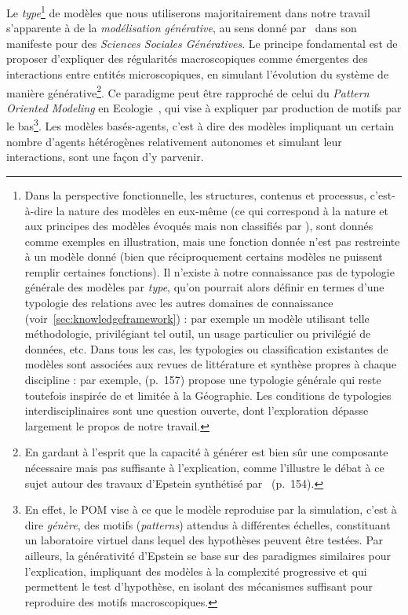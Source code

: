 Le \emph{type}\footnote{Dans la perspective fonctionnelle, les structures, contenus et processus, c'est-à-dire la nature des modèles en eux-même (ce qui correspond à la nature et aux principes des modèles évoqués mais non classifiés par ), sont donnés comme exemples en illustration, mais une fonction donnée n'est pas restreinte à un modèle donné (bien que réciproquement certains modèles ne puissent remplir certaines fonctions). Il n'existe à notre connaissance pas de typologie générale des modèles par \emph{type}, qu'on pourrait alors définir en termes d'une typologie des relations avec les autres domaines de connaissance (voir~\ref{sec:knowledgeframework}) : par exemple un modèle utilisant telle méthodologie, privilégiant tel outil, un usage particulier ou privilégié de données, etc. Dans tous les cas, les typologies ou classification existantes de modèles sont associées aux revues de littérature et synthèse propres à chaque discipline : par exemple, \cite{harvey1969explanation} (p.~157) propose une typologie générale qui reste toutefois inspirée de et limitée à la Géographie. Les conditions de typologies interdisciplinaires sont une question ouverte, dont l'exploration dépasse largement le propos de notre travail.} de modèles que nous utiliserons majoritairement dans notre travail s'apparente à de la \emph{modélisation générative}, au sens donné par~\cite{epstein2006generative} dans son manifeste pour des \emph{Sciences Sociales Génératives}. Le principe fondamental est de proposer d'expliquer des régularités macroscopiques comme émergentes des interactions entre entités microscopiques, en simulant l'évolution du système de manière générative\footnote{En gardant à l'esprit que la capacité à générer est bien sûr une composante nécessaire mais pas suffisante à l'explication, comme l'illustre le débat à ce sujet autour des travaux d'Epstein synthétisé par~\cite{rey2015plateforme} (p.~154).}. Ce paradigme peut être rapproché de celui du \emph{Pattern Oriented Modeling} en Ecologie~\cite{grimm2005pattern}, qui vise à expliquer par production de motifs par le bas\footnote{En effet, le POM vise à ce que le modèle reproduise par la simulation, c'est à dire \emph{génère}, des motifs (\emph{patterns}) attendus à différentes échelles, constituant un laboratoire virtuel dans lequel des hypothèses peuvent être testées. Par ailleurs, la générativité d'Epstein se base sur des paradigmes similaires pour l'explication, impliquant des modèles à la complexité progressive et qui permettent le test d'hypothèse, en isolant des mécanismes suffisant pour reproduire des motifs macroscopiques.}. Les modèles basés-agents, c'est à dire des modèles impliquant un certain nombre d'agents hétérogènes relativement autonomes et simulant leur interactions, sont une façon d'y parvenir.


